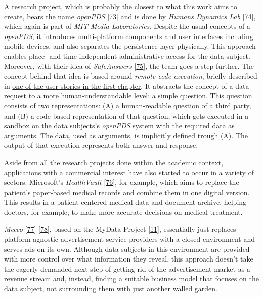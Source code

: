 \documentclass[12pt,english,a4paper,titlepage,cleardoublepage=empty,dottedtoc]{report}
\begin{document}
A research project, which is probably the closest to what this work aims
to create, bears the name \emph{openPDS}
{[}\protect\hyperlink{ref-paper_2012_openpds_on-trusted-use-of-large-scale-personal-data}{73}{]}
and is done by \emph{Humans Dynamics Lab}
{[}\protect\hyperlink{ref-web_mit_openpds-safeanswers-project-page}{74}{]},
which again is part of \emph{MIT Media Laboratories}. Despite the usual
concepts of a \emph{openPDS}, it introduces multi-platform components
and user interfaces including mobile devices, and also separates the
persistence layer physically. This approach enables place- and
time-independent administrative access for the data subject. Moreover,
with their idea of \emph{SafeAnswers}
{[}\protect\hyperlink{ref-paper_2014_openpds_protecting-privacy-of-meta-data-through-safeanswers}{75}{]},
the team goes a step further. The concept behind that idea is based
around \emph{remote code execution}, briefly described in
\protect\hyperlink{header-applying-for-a-loan-and-checking-creditworthiness}{one
of the user stories in the first chapter}. It abstracts the concept of a
data request to a more human-understandable level: a simple question.
This question consists of two representations: (A) a human-readable
question of a third party, and (B) a code-based representation of that
question, which gets executed in a sandbox on the data subjects's
\emph{openPDS} system with the required data as arguments. The data,
used as arguments, is implicitly defined trough (A). The output of that
execution represents both answer and response.

Aside from all the research projects done within the academic context,
applications with a commercial interest have also started to occur in a
variety of sectors. Microsoft's \emph{HealthVault}
{[}\protect\hyperlink{ref-web_microsoft_healthvault}{76}{]}, for
example, which aims to replace the patient's paper-based medical records
and combine them in one digital version. This results in a
patient-centered medical data and document archive, helping doctors, for
example, to make more accurate decisions on medical treatment.

\emph{Meeco} {[}\protect\hyperlink{ref-web_meeco_how-it-works}{77}{]}
{[}\protect\hyperlink{ref-slides_2015_meeco-case-study}{78}{]}, based on
the MyData-Project
{[}\protect\hyperlink{ref-whitepaper_2014_mydata-a-nordic-model-for-human-centered-personal-data-management-and-processing}{11}{]},
essentially just replaces platform-agnostic advertisement service
providers with a closed environment and serves ads on its own. Although
data subjects in this environment are provided with more control over
what information they reveal, this approach doesn't take the eagerly
demanded next step of getting rid of the advertisement market as a
revenue stream and, instead, finding a suitable business model that
focuses on the data subject, not surrounding them with just another
walled garden.
\end{document}
